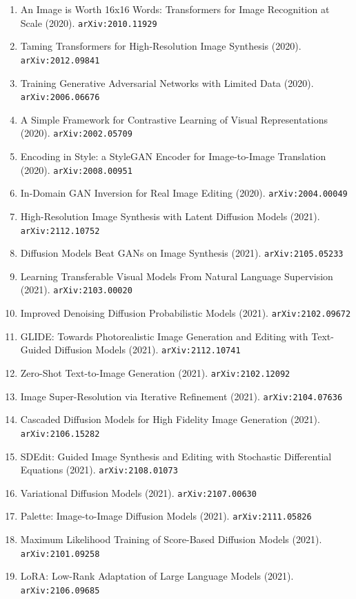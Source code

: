 \documentclass[11pt]{article}
\begin{document}
\begin{enumerate}
  \item An Image is Worth 16x16 Words: Transformers for Image Recognition at Scale (2020). \texttt{arXiv:2010.11929}
  \item Taming Transformers for High-Resolution Image Synthesis (2020). \texttt{arXiv:2012.09841}
  \item Training Generative Adversarial Networks with Limited Data (2020). \texttt{arXiv:2006.06676}
  \item A Simple Framework for Contrastive Learning of Visual Representations (2020). \texttt{arXiv:2002.05709}
  \item Encoding in Style: a StyleGAN Encoder for Image-to-Image Translation (2020). \texttt{arXiv:2008.00951}
  \item In-Domain GAN Inversion for Real Image Editing (2020). \texttt{arXiv:2004.00049}
  \item High-Resolution Image Synthesis with Latent Diffusion Models (2021). \texttt{arXiv:2112.10752}
  \item Diffusion Models Beat GANs on Image Synthesis (2021). \texttt{arXiv:2105.05233}
  \item Learning Transferable Visual Models From Natural Language Supervision (2021). \texttt{arXiv:2103.00020}
  \item Improved Denoising Diffusion Probabilistic Models (2021). \texttt{arXiv:2102.09672}
  \item GLIDE: Towards Photorealistic Image Generation and Editing with Text-Guided Diffusion Models (2021). \texttt{arXiv:2112.10741}
  \item Zero-Shot Text-to-Image Generation (2021). \texttt{arXiv:2102.12092}
  \item Image Super-Resolution via Iterative Refinement (2021). \texttt{arXiv:2104.07636}
  \item Cascaded Diffusion Models for High Fidelity Image Generation (2021). \texttt{arXiv:2106.15282}
  \item SDEdit: Guided Image Synthesis and Editing with Stochastic Differential Equations (2021). \texttt{arXiv:2108.01073}
  \item Variational Diffusion Models (2021). \texttt{arXiv:2107.00630}
  \item Palette: Image-to-Image Diffusion Models (2021). \texttt{arXiv:2111.05826}
  \item Maximum Likelihood Training of Score-Based Diffusion Models (2021). \texttt{arXiv:2101.09258}
  \item LoRA: Low-Rank Adaptation of Large Language Models (2021). \texttt{arXiv:2106.09685}

\end{enumerate}
\end{document}
